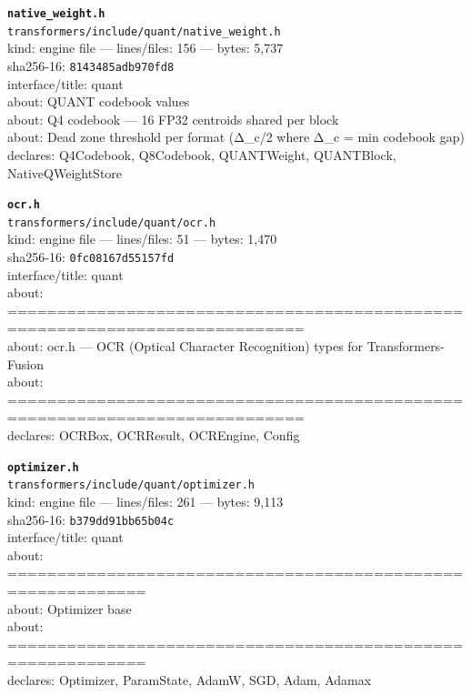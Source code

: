 \noindent\textbf{\texttt{native\_weight.h}}\\
\texttt{transformers/include/quant/native\_weight.h}\\
kind: engine file --- lines/files: 156 --- bytes: 5,737\\
sha256-16: \texttt{8143485adb970fd8}\\
interface/title: quant\\
about: QUANT codebook values\\
about: Q4 codebook — 16 FP32 centroids shared per block\\
about: Dead zone threshold per format (Δ\_c/2 where Δ\_c = min codebook gap)\\
declares: Q4Codebook, Q8Codebook, QUANTWeight, QUANTBlock, NativeQWeightStore\\
\vspace*{6.0pt}

\noindent\textbf{\texttt{ocr.h}}\\
\texttt{transformers/include/quant/ocr.h}\\
kind: engine file --- lines/files: 51 --- bytes: 1,470\\
sha256-16: \texttt{0fc08167d55157fd}\\
interface/title: quant\\
about: ============================================================================\\
about: ocr.h — OCR (Optical Character Recognition) types for Transformers-Fusion\\
about: ============================================================================\\
declares: OCRBox, OCRResult, OCREngine, Config\\
\vspace*{6.0pt}
\newpage

\noindent\textbf{\texttt{optimizer.h}}\\
\texttt{transformers/include/quant/optimizer.h}\\
kind: engine file --- lines/files: 261 --- bytes: 9,113\\
sha256-16: \texttt{b379dd91bb65b04c}\\
interface/title: quant\\
about: ============================================================\\
about: Optimizer base\\
about: ============================================================\\
declares: Optimizer, ParamState, AdamW, SGD, Adam, Adamax\\
\vspace*{6.0pt}

